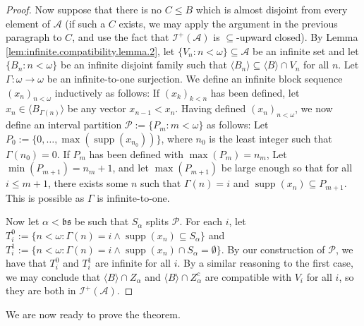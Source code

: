 \documentclass[11pt,reqno]{amsart}
\theoremstyle{plain}
\numberwithin{equation}{section}
\theoremstyle{definition}
\newcommand{\func}{\operatorname}
\renewcommand{\c}[1]{\langle #1 \rangle}
\newcommand{\Po}{\cal{P}}
\newcommand{\cal}{\mathcal}
\renewcommand{\frak}{\mathfrak}
\newcommand{\supp}{\func{supp}}
\newcommand{\A}{\cal{A}}
\newcommand{\I}{\cal{I}}
\begin{document}
\begin{proof}
    Now suppose that there is no $C \leq B$ which is almost disjoint from every element of $\A$ (if such a $C$ exists, we may apply the argument in the previous paragraph to $C$, and use the fact that $\I^+(\A)$ is $\subseteq$-upward closed). By Lemma \ref{lem:infinite.compatibility.lemma.2}, let $\{V_n : n < \omega\} \subseteq \A$ be an infinite set and let $\{B_n : n < \omega\}$ be an infinite disjoint family such that $\c{B_n} \subseteq \c{B} \cap V_n$ for all $n$. Let $\Gamma : \omega \to \omega$ be an infinite-to-one surjection. We define an infinite block sequence $(x_n)_{n<\omega}$ inductively as follows: If $(x_k)_{k<n}$ has been defined, let $x_n \in \c{B_{\Gamma(n)}}$ be any vector $x_{n-1} < x_n$. Having defined $(x_n)_{n<\omega}$, we now define an interval partition $\Po := \{P_m : m < \omega\}$ as follows: Let $P_0 := \{0,\dots,\max(\supp(x_{n_0}))\}$, where $n_0$ is the least integer such that $\Gamma(n_0) = 0$. If $P_m$ has been defined with $\max(P_m) = n_m$, Let $\min(P_{m+1}) = n_m + 1$, and let $\max(P_{m+1})$ be large enough so that for all $i \leq m+1$, there exists some $n$ such that $\Gamma(n) = i$ and $\supp(x_n) \subseteq P_{m+1}$. This is possible as $\Gamma$ is infinite-to-one. 

    Now let $\alpha < \frak{bs}$ be such that $S_\alpha$ splits $\Po$. For each $i$, let $T_i^0 := \{n < \omega : \Gamma(n) = i \wedge \supp(x_n) \subseteq S_\alpha\}$ and $T_i^1 := \{n < \omega : \Gamma(n) = i \wedge \supp(x_n) \cap S_\alpha = \emptyset\}$. By our construction of $\Po$, we have that $T_i^0$ and $T_i^1$ are infinite for all $i$. By a similar reasoning to the first case, we may conclude that $\c{B} \cap Z_\alpha$ and $\c{B} \cap Z_\alpha^c$ are compatible with $V_i$ for all $i$, so they are both in $\I^+(\A)$.
\end{proof}

We are now ready to prove the theorem.
\end{document}
